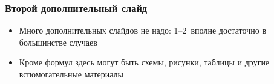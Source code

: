 \documentclass
  [ russian
  , aspectratio=1610 %
  ] {beamer}
\begin{document}
\begin{frame}
    \frametitle{Второй дополнительный слайд}
    \begin{itemize}
        \item Много дополнительных слайдов не надо: 1--2~вполне достаточно в большинстве случаев
        \item Кроме формул здесь могут быть схемы, рисунки, таблицы и другие вспомогательные материалы
    \end{itemize}

\end{frame}
\end{document}
